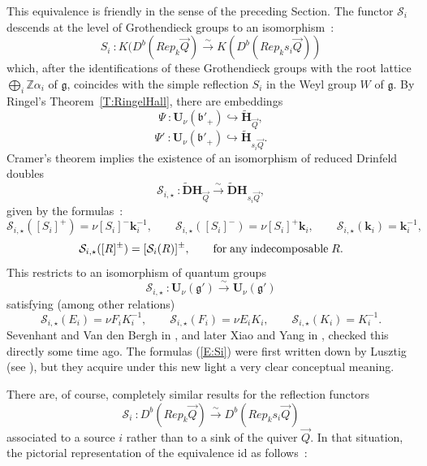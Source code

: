 \documentclass[a4paper,10pt]{amsart}
\def\Z{\mathbb{Z}}
\def\H{\mathbf{H}}
\def\U{\mathbf{U}}
\def\a{\alpha}
\def\g{\mathfrak{g}}
\def\bo{\mathfrak{b}}
\numberwithin{equation}{section}
\begin{document}
{\vspace{.5in}

This equivalence is friendly in the sense of the preceding Section.
The functor $\mathcal{S}_i$ descends at the level of Grothendieck groups to an isomorphism~:
$$S_i~:K(D^b(Rep_k\vec{Q}) \stackrel{\sim}{\to} K(D^b(Rep_ks_i\vec{Q}))$$
which, after the identifications of these Grothendieck groups with the root lattice $\bigoplus_i\Z\a_i$ of $\g$, coincides with the simple reflection $S_i$ in the Weyl group $W$ of $\g$.
By Ringel's Theorem~\ref{T:RingelHall}, there are embeddings
$$\Psi~: \U_\nu(\bo'_+) \hookrightarrow \widetilde{\H}_{\vec{Q}},$$
$$\Psi'~: \U_\nu(\bo'_+) \hookrightarrow \widetilde{\H}_{s_i\vec{Q}}.$$
Cramer's theorem implies the existence of an isomorphism of reduced Drinfeld doubles
$$\mathcal{S}_{i,\star}~: \widetilde{\mathbf{D}}\H_{\vec{Q}} \stackrel{\sim}{\to} \widetilde{\mathbf{D}}\H_{s_i\vec{Q}},$$
given by the formulas~:
$$\mathcal{S}_{i,\star}([S_i]^+)=\nu [S_i]^-\mathbf{k}_i^{-1}, \qquad \mathcal{S}_{i,\star}([S_i]^-)=\nu [S_i]^+ \mathbf{k}_i, \qquad \mathcal{S}_{i,\star}(\mathbf{k}_i)=\mathbf{k}_i^{-1},$$
$$\mathcal{S}_{i,\star}([R]^{\pm})=[\mathcal{S}_i(R)]^{\pm}, \qquad \text{for\;any\;indecomposable}\; R.$$
This restricts to an isomorphism of quantum groups
$$\mathcal{S}_{i,\star}~: \U_\nu(\g') \stackrel{\sim}{\to} \U_\nu(\g')$$
satisfying (among other relations)
\begin{equation}\label{E:Si}
\mathcal{S}_{i,\star}(E_i)=\nu F_i{K}_i^{-1}, \qquad \mathcal{S}_{i,\star}(F_i)=\nu E_i {K}_i, \qquad \mathcal{S}_{i,\star}({K}_i)={K}_i^{-1}.
\end{equation}
Sevenhant and Van den Bergh in \cite{SVdB2}, and later Xiao and Yang in \cite{XiaoBGP}, checked this directly some time ago.
The formulas (\ref{E:Si}) were first written down by Lusztig (see \cite{Lu1}), but they acquire under this new light a very clear conceptual meaning.

\vspace{.05in}

There are, of course, completely similar results for the reflection functors
$$\mathcal{S}_i~: D^b(Rep_k\vec{Q}) \stackrel{\sim}{\to} D^b(Rep_ks_i\vec{Q})$$
associated to a source $i$ rather than to a sink of the quiver $\vec{Q}$. In that situation, the pictorial representation of the equivalence id as follows~:

\vspace{.3in}

}
\end{document}

